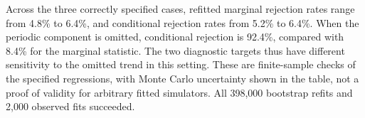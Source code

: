 Across the three correctly specified cases, refitted marginal rejection
rates range from 4.8\% to 6.4\%, and
conditional rejection rates from 5.2\% to 6.4\%.
When the periodic component is omitted, conditional rejection is
92.4\%, compared with 8.4\% for the marginal statistic.
The two diagnostic targets thus have different sensitivity to the
omitted trend in this setting. These are finite-sample
checks of the specified regressions, with Monte Carlo uncertainty shown
in the table, not a proof of validity for arbitrary fitted simulators.
All 398,000 bootstrap refits and 2,000 observed fits succeeded.
